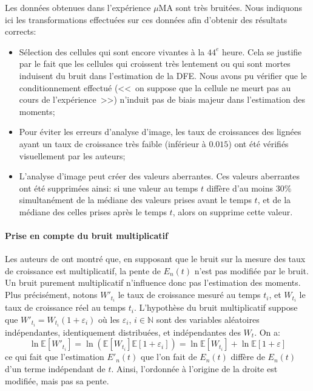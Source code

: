 \documentclass[12pt]{article}
\newcommand{\pth}[1]{\left(#1\right)}
\newcommand{\cro}[1]{\left[#1\right]}
\newcommand{\En}{\mathbb{N}}
\newcommand{\Esp}[1]{\mathbb{E}\cro{#1}}
\begin{document}
Les données obtenues dans l'expérience $\mu$MA sont très bruitées. Nous indiquons ici les transformations effectuées sur ces données afin d'obtenir des résultats corrects:
\begin{itemize}
\item Sélection des cellules qui sont encore vivantes à la $44^e$ heure. Cela se justifie par le fait que les cellules qui croissent très lentement ou qui sont mortes induisent du bruit dans l'estimation de la DFE. Nous avons pu vérifier que le conditionnement effectué (<<~on suppose que la cellule ne meurt pas au cours de l'expérience~>>) n'induit pas de biais majeur dans l'estimation des moments;
\item Pour éviter les erreurs d'analyse d'image, les taux de croissances des lignées ayant un taux de croissance très faible (inférieur à $0.015$) ont été vérifiés visuellement par les auteurs;
\item L'analyse d'image peut créer des valeurs aberrantes. Ces valeurs aberrantes ont été supprimées ainsi: si une valeur au temps $t$ diffère d'au moins $30\%$ simultanément de la médiane des valeurs prises avant le temps $t$, et de la médiane des celles prises après le temps $t$, alors on supprime cette valeur.
\end{itemize}


\paragraph{Prise en compte du bruit multiplicatif}

Les auteurs de \cite{rob} ont montré que, en supposant que le bruit sur la mesure des taux de croissance est multiplicatif, la pente de $E_n(t)$ n'est pas modifiée par le bruit. Un bruit purement multiplicatif n'influence donc pas l'estimation des moments. Plus précisément, notons $W'_{t_i}$ le taux de croissance mesuré au temps $t_i$, et $W_{t_i}$ le taux de croissance réel au temps $t_i$. L'hypothèse du bruit multiplicatif suppose que $W'_{t_i}=W_{t_i}(1+\varepsilon_i)$ où les $\varepsilon_i$, $i\in\En$ sont des variables aléatoires indépendantes, identiquement distribuées, et indépendantes des $W_t$. On a:
\[\ln\Esp{W'_{t_i}}=\ln\pth{\Esp{W_{t_i}}\Esp{1+\varepsilon_i}}=\ln\Esp{W_{t_i}}+\ln\Esp{1+\varepsilon}\]
ce qui fait que l'estimation $E'_n(t)$ que l'on fait de $E_n(t)$ diffère de $E_n(t)$ d'un terme indépendant de $t$. Ainsi, l'ordonnée à l'origine de la droite est modifiée, mais pas sa pente.
\end{document}
